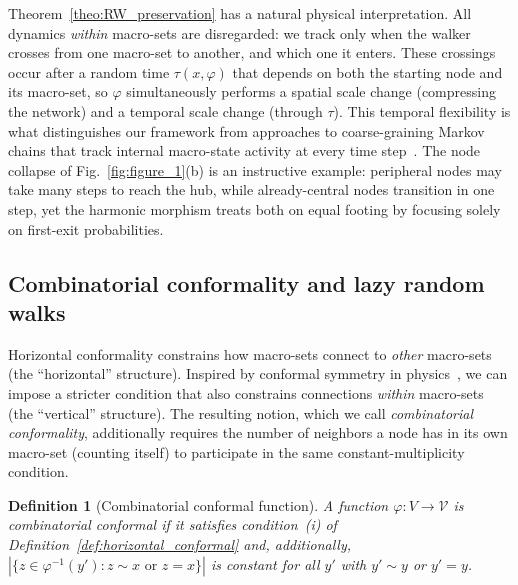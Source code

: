 \documentclass[twocolumn,superscriptaddress,tightenlines,aps,prx,floatfix]{revtex4-2}
\newtheorem{definition}{Definition}
\begin{document}
\begin{bibunit}
Theorem~\ref{theo:RW_preservation} has a natural physical interpretation. 
All dynamics \emph{within} macro-sets are disregarded: we track only when the walker crosses from one macro-set to another, and which one it enters. 
These crossings occur after a random time $\tau(x, \varphi)$ that depends on both the starting node and its macro-set, so $\varphi$ simultaneously performs a spatial scale change (compressing the network) and a temporal scale change (through $\tau$). 
This temporal flexibility is what distinguishes our framework from approaches to coarse-graining Markov chains that track internal macro-state activity at every time step~\cite{Faccin_2017,Consensus_coarse_graining_Barahona,rosas2024softwarenaturalworldcomputational}. 
The node collapse of Fig.~\ref{fig:figure_1}(b) is an instructive example: peripheral nodes may take many steps to reach the hub, while already-central nodes transition in one step, yet the harmonic morphism treats both on equal footing by focusing solely on first-exit probabilities. 

\subsection{Combinatorial conformality and lazy random walks}
Horizontal conformality constrains how macro-sets connect to \emph{other} macro-sets (the ``horizontal'' structure). 
Inspired by conformal symmetry in physics~\cite{Introduction_to_Conformal_Field_Theory,Conformal_Invariance_Lattice_Models_Smirnov}, we can impose a stricter condition that also constrains connections \emph{within} macro-sets (the ``vertical'' structure). 
The resulting notion, which we call \emph{combinatorial conformality}, additionally requires the number of neighbors a node has in its own macro-set (counting itself) to participate in the same constant-multiplicity condition.

\begin{definition}[Combinatorial conformal function]
\label{def:combinatorial_conformal}
A function $\varphi: V \rightarrow \mathcal{V}$ is \emph{combinatorial conformal} if it satisfies condition~(i) of Definition~\ref{def:horizontal_conformal} and, additionally, $|\{ z\in \varphi^{-1}(y') : z \sim x \text{ or } z = x \}|$ is constant for all $y'$ with $y' \sim y$ or $y' = y$.
\end{definition}


\end{bibunit}
\end{document}
